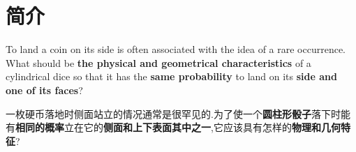 \documentclass[UTF8]{gapd}
\begin{document}
\maketitle


\section{简介}
\label{sec:Introduction}
To land a coin on its side is often associated with the idea of a rare occurrence. What should be \textbf{the physical and geometrical characteristics} of a cylindrical dice so that it has the \textbf{same probability} to land on its \textbf{side and one of its faces}?

一枚硬币落地时侧面站立的情况通常是很罕见的.为了使一个\textbf{圆柱形骰子}落下时能有\textbf{相同的概率}立在它的\textbf{侧面和上下表面其中之一},它应该具有怎样的\textbf{物理和几何特征}?

%

\end{document}
